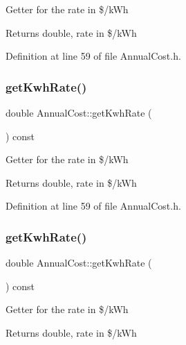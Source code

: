 Getter for the rate in \$/k\+Wh \begin{DoxyReturn}{Returns}
double, rate in \$/k\+Wh 
\end{DoxyReturn}


Definition at line 59 of file Annual\+Cost.\+h.

\mbox{\label{class_annual_cost_ac01ed415360b6f52f61ec8a581333c29}} 
\subsubsection{\texorpdfstring{get\+Kwh\+Rate()}{getKwhRate()}\hspace{0.1cm}{\footnotesize\ttfamily [2/3]}}
{\footnotesize\ttfamily double Annual\+Cost\+::get\+Kwh\+Rate (\begin{DoxyParamCaption}{ }\end{DoxyParamCaption}) const\hspace{0.3cm}{\ttfamily [inline]}}

Getter for the rate in \$/k\+Wh \begin{DoxyReturn}{Returns}
double, rate in \$/k\+Wh 
\end{DoxyReturn}


Definition at line 59 of file Annual\+Cost.\+h.

\mbox{\label{class_annual_cost_ac01ed415360b6f52f61ec8a581333c29}} 
\subsubsection{\texorpdfstring{get\+Kwh\+Rate()}{getKwhRate()}\hspace{0.1cm}{\footnotesize\ttfamily [3/3]}}
{\footnotesize\ttfamily double Annual\+Cost\+::get\+Kwh\+Rate (\begin{DoxyParamCaption}{ }\end{DoxyParamCaption}) const\hspace{0.3cm}{\ttfamily [inline]}}

Getter for the rate in \$/k\+Wh \begin{DoxyReturn}{Returns}
double, rate in \$/k\+Wh 
\end{DoxyReturn}


